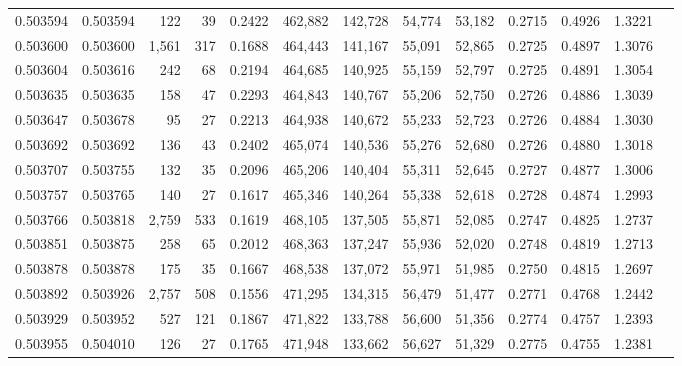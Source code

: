 \begin{tabular}{rrrrrrrrrrrrr}
0.503594 & 0.503594 &   122 &    39 &                                     0.2422 & 462,882 & 142,728 &  54,774 &  53,182 & 0.2715 & 0.4926 & 1.3221 \\
0.503600 & 0.503600 & 1,561 &   317 &                                     0.1688 & 464,443 & 141,167 &  55,091 &  52,865 & 0.2725 & 0.4897 & 1.3076 \\
0.503604 & 0.503616 &   242 &    68 &                                     0.2194 & 464,685 & 140,925 &  55,159 &  52,797 & 0.2725 & 0.4891 & 1.3054 \\
0.503635 & 0.503635 &   158 &    47 &                                     0.2293 & 464,843 & 140,767 &  55,206 &  52,750 & 0.2726 & 0.4886 & 1.3039 \\
0.503647 & 0.503678 &    95 &    27 &                                     0.2213 & 464,938 & 140,672 &  55,233 &  52,723 & 0.2726 & 0.4884 & 1.3030 \\
0.503692 & 0.503692 &   136 &    43 &                                     0.2402 & 465,074 & 140,536 &  55,276 &  52,680 & 0.2726 & 0.4880 & 1.3018 \\
0.503707 & 0.503755 &   132 &    35 &                                     0.2096 & 465,206 & 140,404 &  55,311 &  52,645 & 0.2727 & 0.4877 & 1.3006 \\
0.503757 & 0.503765 &   140 &    27 &                                     0.1617 & 465,346 & 140,264 &  55,338 &  52,618 & 0.2728 & 0.4874 & 1.2993 \\
0.503766 & 0.503818 & 2,759 &   533 &                                     0.1619 & 468,105 & 137,505 &  55,871 &  52,085 & 0.2747 & 0.4825 & 1.2737 \\
0.503851 & 0.503875 &   258 &    65 &                                     0.2012 & 468,363 & 137,247 &  55,936 &  52,020 & 0.2748 & 0.4819 & 1.2713 \\
0.503878 & 0.503878 &   175 &    35 &                                     0.1667 & 468,538 & 137,072 &  55,971 &  51,985 & 0.2750 & 0.4815 & 1.2697 \\
0.503892 & 0.503926 & 2,757 &   508 &                                     0.1556 & 471,295 & 134,315 &  56,479 &  51,477 & 0.2771 & 0.4768 & 1.2442 \\
0.503929 & 0.503952 &   527 &   121 &                                     0.1867 & 471,822 & 133,788 &  56,600 &  51,356 & 0.2774 & 0.4757 & 1.2393 \\
0.503955 & 0.504010 &   126 &    27 &                                     0.1765 & 471,948 & 133,662 &  56,627 &  51,329 & 0.2775 & 0.4755 & 1.2381 \\

\end{tabular}
